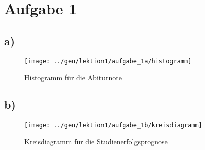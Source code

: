 \documentclass[a4paper,12pt]{article}
\begin{document}
\section{Aufgabe 1}

\subsection{a)}
  
  \begin{figure}[h]
    \centering
    \texttt{[image: ../gen/lektion1/aufgabe\_1a/histogramm]}
    \caption{Histogramm für die Abiturnote}
  \end{figure}

\newpage
\subsection{b)}
  
  \begin{figure}[h]
    \centering
    \texttt{[image: ../gen/lektion1/aufgabe\_1b/kreisdiagramm]}
    \caption{Kreisdiagramm für die Studienerfolgsprognose}
  \end{figure}
\end{document}
